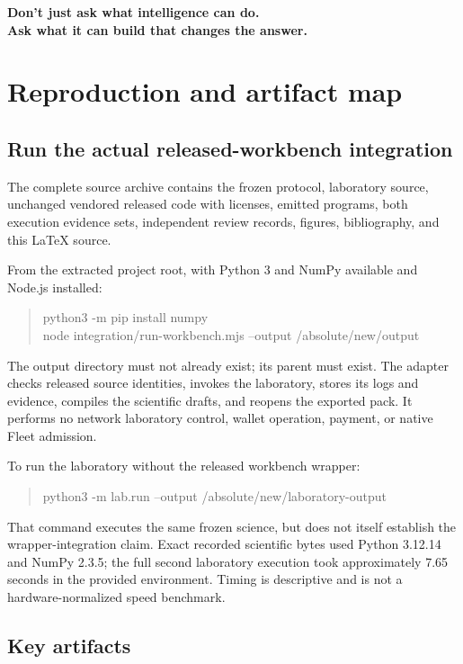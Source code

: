 \documentclass[11pt,a4paper]{article}
\begin{document}
\begin{center}
\vspace{3mm}
{\sffamily\large\bfseries\color{Purple}
Don't just ask what intelligence can do.\\
Ask what it can build that changes the answer.}
\end{center}

\clearpage
\appendix
\section{Reproduction and artifact map}

\subsection{Run the actual released-workbench integration}

The complete source archive contains the frozen protocol, laboratory source, unchanged vendored released code with licenses, emitted programs, both execution evidence sets, independent review records, figures, bibliography, and this LaTeX source.

From the extracted project root, with Python 3 and NumPy available and Node.js installed:
\begin{quote}\small\ttfamily
python3 -m pip install numpy\\
node integration/run-workbench.mjs --output /absolute/new/output
\end{quote}
The output directory must not already exist; its parent must exist. The adapter checks released source identities, invokes the laboratory, stores its logs and evidence, compiles the scientific drafts, and reopens the exported pack. It performs no network laboratory control, wallet operation, payment, or native Fleet admission.

To run the laboratory without the released workbench wrapper:
\begin{quote}\small\ttfamily
python3 -m lab.run --output /absolute/new/laboratory-output
\end{quote}
That command executes the same frozen science, but does not itself establish the wrapper-integration claim. Exact recorded scientific bytes used Python 3.12.14 and NumPy 2.3.5; the full second laboratory execution took approximately 7.65 seconds in the provided environment. Timing is descriptive and is not a hardware-normalized speed benchmark.

\subsection{Key artifacts}
\end{document}
